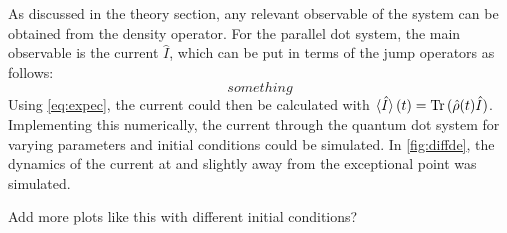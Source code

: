 \documentclass[../main.tex]{subfiles}
\begin{document}
As discussed in the theory section, any relevant observable of the system can be obtained from the density operator. For the parallel dot system, the main observable is the current $\hat I$, which can be put in terms of the jump operators as follows: 
\begin{equation}
    something
\end{equation}
Using \cref{eq:expec}, the current could then be calculated with $\braket{\hat I}(t) = \operatorname{Tr}{(\hat \rho(t)\hat I)}$. Implementing this numerically, the current through the quantum dot system for varying parameters and initial conditions could be simulated. In \cref{fig:diffde}, the dynamics of the current at and slightly away from the exceptional point was simulated.


Add more plots like this with different initial conditions?
\end{document}

